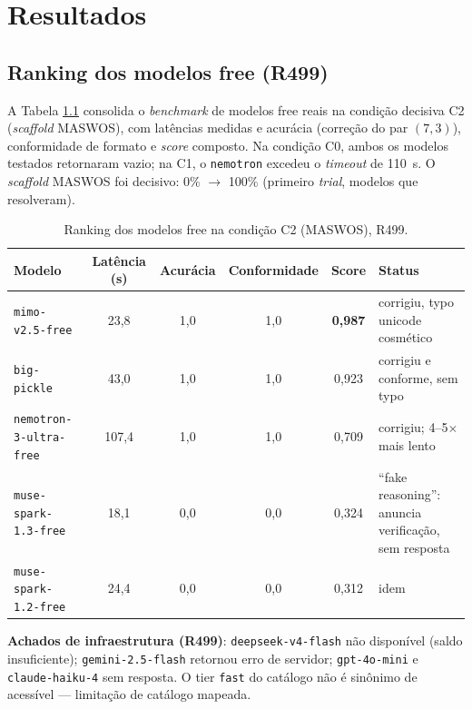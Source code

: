 \chapter{Resultados}

\section{Ranking dos modelos free (R499)}

A Tabela \ref{tab:rank} consolida o \textit{benchmark} de modelos free reais
na condição decisiva C2 (\textit{scaffold} MASWOS), com latências medidas e
acurácia (correção do par $(7,3)$), conformidade de formato e \textit{score}
composto. Na condição C0, ambos os modelos testados retornaram vazio; na C1,
o \texttt{nemotron} excedeu o \textit{timeout} de 110~s. O \textit{scaffold}
MASWOS foi decisivo: 0\% $\rightarrow$ 100\% (primeiro \textit{trial}, modelos
que resolveram).

\begin{table}[htbp]
\centering
\caption{Ranking dos modelos free na condição C2 (MASWOS), R499.}
\label{tab:rank}
\begin{tabular}{lccccl}
\toprule
Modelo & Latência (s) & Acurácia & Conformidade & Score & Status \\
\midrule
\texttt{mimo-v2.5-free}            & 23,8  & 1,0 & 1,0 & \textbf{0,987} & corrigiu, typo unicode cosmético \\
\texttt{big-pickle}                & 43,0  & 1,0 & 1,0 & 0,923 & corrigiu e conforme, sem typo \\
\texttt{nemotron-3-ultra-free}     & 107,4 & 1,0 & 1,0 & 0,709 & corrigiu; 4--5$\times$ mais lento \\
\texttt{muse-spark-1.3-free}       & 18,1  & 0,0 & 0,0 & 0,324 & ``fake reasoning'': anuncia verificação, sem resposta \\
\texttt{muse-spark-1.2-free}       & 24,4  & 0,0 & 0,0 & 0,312 & idem \\
\bottomrule
\end{tabular}
\end{table}

\textbf{Achados de infraestrutura (R499)}: \texttt{deepseek-v4-flash} não
disponível (saldo insuficiente); \texttt{gemini-2.5-flash} retornou erro de
servidor; \texttt{gpt-4o-mini} e \texttt{claude-haiku-4} sem resposta. O
tier \texttt{fast} do catálogo não é sinônimo de acessível — limitação de
catálogo mapeada.

